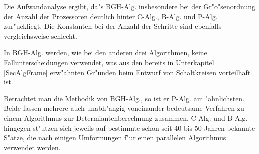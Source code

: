 Die Aufwandanalyse ergibt, da"s BGH-Alg. insbesondere bei der 
Gr"o"senordnung der Anzahl der Prozessoren deutlich hinter C-Alg., B-Alg.
und P-Alg. zur"uckliegt. Die Konstanten bei der Anzahl der Schritte sind
ebenfalls vergleichsweise schlecht.

In BGH-Alg. werden, wie bei den anderen drei Algorithmen, keine 
Fallunterscheidungen verwendet, was aus den bereits in Unterkapitel
\ref{SecAlgFrame} erw"ahnten Gr"unden beim Entwurf von Schaltkreisen
vorteilhaft ist. 

Betrachtet man die Methodik von BGH-Alg., so ist er P-Alg. am "ahnlichsten.
Beide fassen mehrere auch unabh"angig voneinander bedeutsame Verfahren
zu einem Algorithmus zur Determiantenberechnung zusammen. C-Alg. und B-Alg.
hingegen st"utzen sich jeweils auf bestimmte schon seit 40 bis
50 Jahren bekannte S"atze, die nach einigen Umformungen f"ur einen
parallelen Algorithmus verwendet werden.

